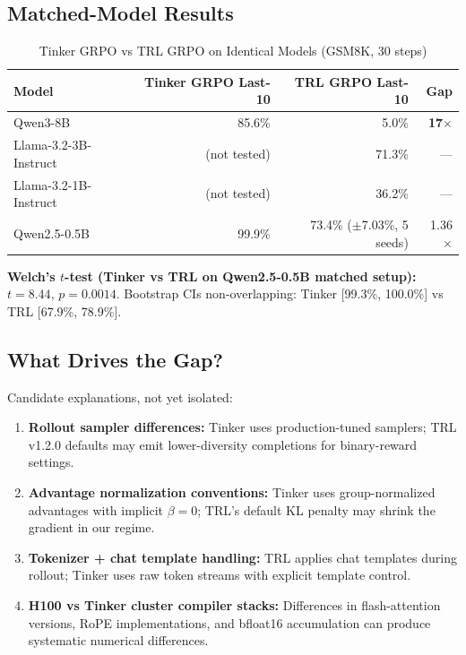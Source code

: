 \documentclass[12pt,a4paper]{report}
\theoremstyle{definition}
\begin{document}
\subsection{Matched-Model Results}

\begin{table}[htbp]
\centering
\caption{Tinker GRPO vs TRL GRPO on Identical Models (GSM8K, 30 steps)}
\label{tab:framework-gap}
\begin{tabular}{lrrr}
\toprule
\textbf{Model} & \textbf{Tinker GRPO Last-10} & \textbf{TRL GRPO Last-10} & \textbf{Gap} \\
\midrule
Qwen3-8B & 85.6\% & 5.0\% & \textbf{17$\times$} \\
Llama-3.2-3B-Instruct & (not tested) & 71.3\% & --- \\
Llama-3.2-1B-Instruct & (not tested) & 36.2\% & --- \\
Qwen2.5-0.5B & 99.9\% & 73.4\% ($\pm$7.03\%, 5 seeds) & 1.36$\times$ \\
\bottomrule
\end{tabular}
\end{table}

\textbf{Welch's $t$-test (Tinker vs TRL on Qwen2.5-0.5B matched setup):} $t = 8.44$, $p = 0.0014$.
Bootstrap CIs non-overlapping: Tinker [99.3\%, 100.0\%] vs TRL [67.9\%, 78.9\%].

\subsection{What Drives the Gap?}

Candidate explanations, not yet isolated:
\begin{enumerate}[nosep]
\item \textbf{Rollout sampler differences:} Tinker uses production-tuned samplers; TRL v1.2.0 defaults may
      emit lower-diversity completions for binary-reward settings.
\item \textbf{Advantage normalization conventions:} Tinker uses group-normalized advantages with implicit
      $\beta=0$; TRL's default KL penalty may shrink the gradient in our regime.
\item \textbf{Tokenizer + chat template handling:} TRL applies chat templates during rollout; Tinker uses
      raw token streams with explicit template control.
\item \textbf{H100 vs Tinker cluster compiler stacks:} Differences in flash-attention versions, RoPE
      implementations, and bfloat16 accumulation can produce systematic numerical differences.
\end{enumerate}
\end{document}
